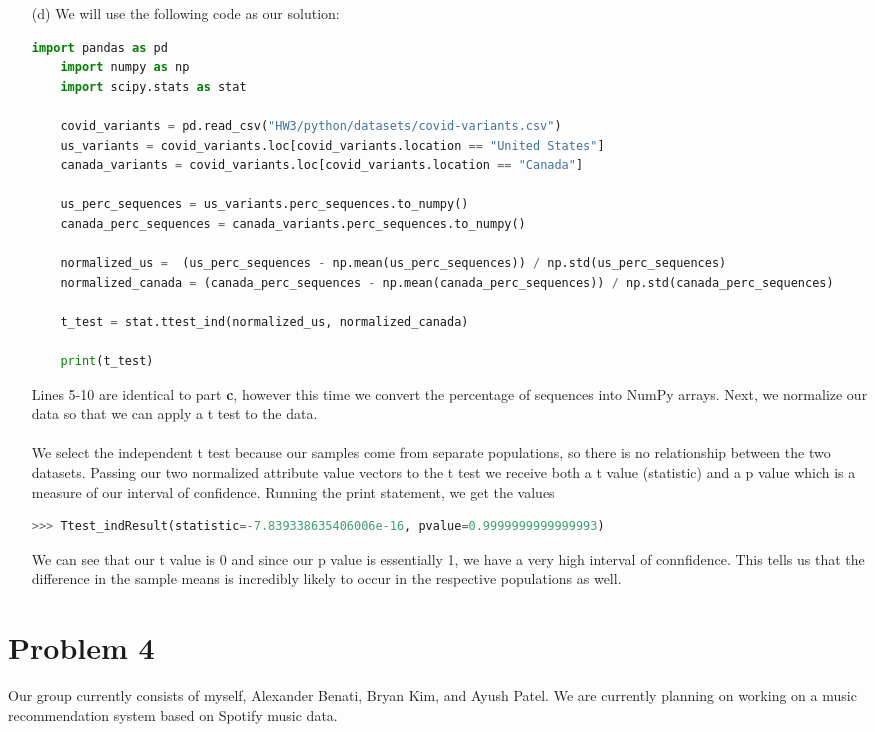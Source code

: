 \documentclass[12pt, letterpaper]{article}
\begin{document}
\begin{enumerate}
    \item [(d)] We will use the following code as our solution:
\begin{lstlisting}[language = python]
    import pandas as pd
    import numpy as np
    import scipy.stats as stat
    
    covid_variants = pd.read_csv("HW3/python/datasets/covid-variants.csv")
    us_variants = covid_variants.loc[covid_variants.location == "United States"]
    canada_variants = covid_variants.loc[covid_variants.location == "Canada"]
    
    us_perc_sequences = us_variants.perc_sequences.to_numpy()
    canada_perc_sequences = canada_variants.perc_sequences.to_numpy()
    
    normalized_us =  (us_perc_sequences - np.mean(us_perc_sequences)) / np.std(us_perc_sequences)
    normalized_canada = (canada_perc_sequences - np.mean(canada_perc_sequences)) / np.std(canada_perc_sequences)
    
    t_test = stat.ttest_ind(normalized_us, normalized_canada)
    
    print(t_test)
\end{lstlisting}
    Lines 5-10 are identical to part {\bf c}, however this time we convert the percentage of 
    sequences into NumPy arrays. Next, we normalize our data so that we can apply a t test to the data. \\ \\ 
    We select the independent t test because our samples come from separate populations, so there 
    is no relationship between the two datasets. Passing our two normalized attribute value vectors 
    to the t test we receive both a t value (statistic) and a p value which is a measure of our interval 
    of confidence. Running the print statement, we get the values 
\begin{lstlisting}[language = python]
    >>> Ttest_indResult(statistic=-7.839338635406006e-16, pvalue=0.9999999999999993)
\end{lstlisting}
    We can see that our t value is 0 and since our p value is essentially 1, we have a very high interval of connfidence. This tells 
    us that the difference in the sample means is incredibly likely to occur in the respective populations as well. 
\end{enumerate}

\newpage
\noindent\makebox[\linewidth]{\rule{18cm}{0.4pt}}
\section*{Problem 4}
Our group currently consists of myself, Alexander Benati, Bryan Kim, and Ayush Patel. We are currently 
planning on working on a music recommendation system based on Spotify music data. 
\end{document}
